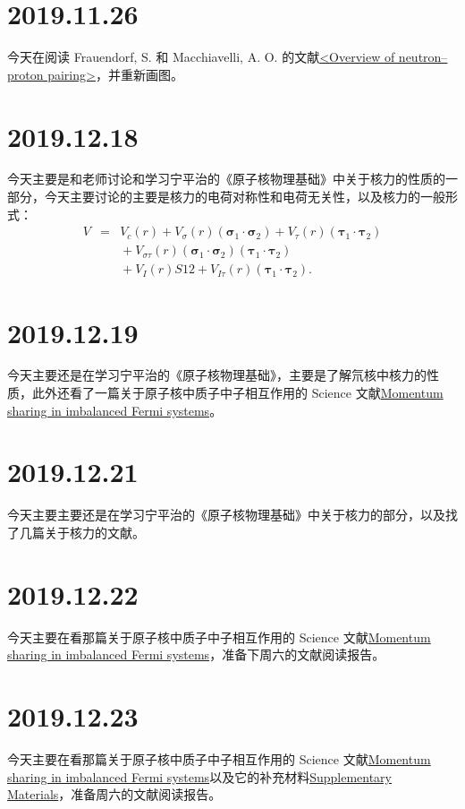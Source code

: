 \section{2019.11.26}
今天在阅读 Frauendorf, S. 和 Macchiavelli, A. O. 的文献\href{http://dx.doi.org/10.1016/j.ppnp.2014.07.001}{<Overview of neutron–proton pairing>}，并重新画图。

\section{2019.12.18}
今天主要是和老师讨论和学习宁平治的《原子核物理基础》中关于核力的性质的一部分，今天主要讨论的主要是核力的电荷对称性和电荷无关性，以及核力的一般形式：
\begin{eqnarray}
V&=&V_c(r)+V_\sigma(r)(\bm{\sigma}_1\cdot\bm{\sigma}_2)+V_\tau(r)(\bm{\tau}_1\cdot\bm{\tau}_2)\nonumber\\
&&{}+V_{\sigma\tau}(r)(\bm{\sigma}_1\cdot\bm{\sigma}_2)(\bm{\tau}_1\cdot\bm{\tau}_2)\nonumber\\
&&{}+V_I(r)S{12}+V_{I\tau}(r)(\bm{\tau}_1\cdot\bm{\tau}_2).
\end{eqnarray}

\section{2019.12.19}
今天主要还是在学习宁平治的《原子核物理基础》，主要是了解氘核中核力的性质，此外还看了一篇关于原子核中质子中子相互作用的 Science 文献\href{https://science.sciencemag.org/content/346/6209/614}{Momentum sharing in imbalanced Fermi systems}。

\section{2019.12.21}
今天主要主要还是在学习宁平治的《原子核物理基础》中关于核力的部分，以及找了几篇关于核力的文献。

\section{2019.12.22}
今天主要在看那篇关于原子核中质子中子相互作用的 Science 文献\href{https://science.sciencemag.org/content/346/6209/614}{Momentum sharing in imbalanced Fermi systems}，准备下周六的文献阅读报告。

\section{2019.12.23}
今天主要在看那篇关于原子核中质子中子相互作用的 Science 文献\href{https://science.sciencemag.org/content/346/6209/614}{Momentum sharing in imbalanced Fermi systems}以及它的补充材料\href{https://science.sciencemag.org/content/suppl/2014/10/15/science.1256785.DC1}{Supplementary Materials}，准备周六的文献阅读报告。

